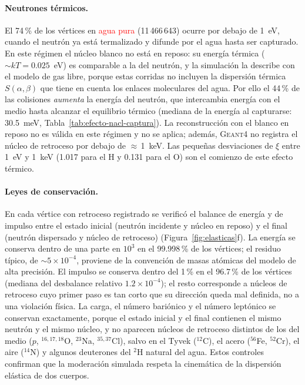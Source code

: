 \paragraph{Neutrones térmicos.} El 74\,\% de los vértices en \textcolor{red}{agua pura} (11\,466\,643) ocurre por debajo de 1~eV, cuando el neutrón ya está termalizado y difunde por el agua hasta ser capturado. En este régimen el núcleo blanco no está en reposo: su energía térmica ($\sim kT=0.025$~eV) es comparable a la del neutrón, y la simulación la describe con el modelo de gas libre, porque estas corridas no incluyen la dispersión térmica $S(\alpha,\beta)$ que tiene en cuenta los enlaces moleculares del agua. Por ello el 44\,\% de las colisiones \emph{aumenta} la energía del neutrón, que intercambia energía con el medio hasta alcanzar el equilibrio térmico (mediana de la energía al capturarse: 30.5~meV, Tabla~\ref{tab:efecto-nacl-captura}). La reconstrucción con el blanco en reposo no es válida en este régimen y no se aplica; además, \textsc{Geant4} no registra el núcleo de retroceso por debajo de $\approx$\,1~keV. Las pequeñas desviaciones de $\xi$ entre 1~eV y 1~keV (1.017 para el H y 0.131 para el O) son el comienzo de este efecto térmico.

\paragraph{Leyes de conservación.} En cada vértice con retroceso registrado se verificó el balance de energía y de impulso entre el estado inicial (neutrón incidente y núcleo en reposo) y el final (neutrón dispersado y núcleo de retroceso) (Figura~\ref{fig:elasticas}f). La energía se conserva dentro de una parte en $10^{3}$ en el 99.998\,\% de los vértices; el residuo típico, de $\sim5\times10^{-4}$, proviene de la convención de masas atómicas del modelo de alta precisión. El impulso se conserva dentro del 1\,\% en el 96.7\,\% de los vértices (mediana del desbalance relativo $1.2\times10^{-4}$); el resto corresponde a núcleos de retroceso cuyo primer paso es tan corto que su dirección queda mal definida, no a una violación física. La carga, el número bariónico y el número leptónico se conservan exactamente, porque el estado inicial y el final contienen el mismo neutrón y el mismo núcleo, y no aparecen núcleos de retroceso distintos de los del medio ($p$, $^{16,17,18}$O, $^{23}$Na, $^{35,37}$Cl), salvo en el Tyvek ($^{12}$C), el acero ($^{56}$Fe, $^{52}$Cr), el aire ($^{14}$N) y algunos deuterones del $^{2}$H natural del agua. Estos controles confirman que la moderación simulada respeta la cinemática de la dispersión elástica de dos cuerpos.

